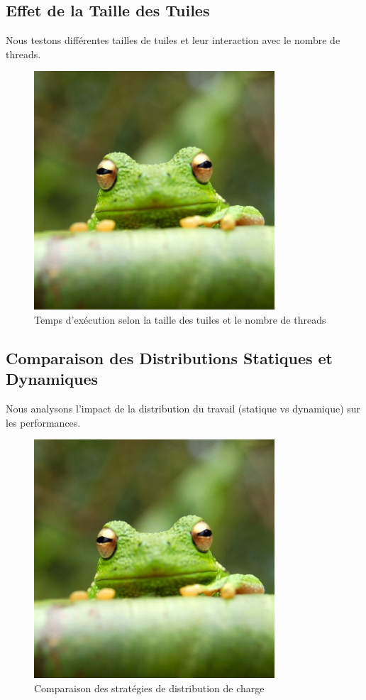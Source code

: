 \documentclass{article}
\begin{document}
\subsection{Effet de la Taille des Tuiles}
Nous testons différentes tailles de tuiles et leur interaction avec le nombre de threads.

\begin{figure}[h]
    \centering
    \includegraphics[width=0.8\textwidth]{frog.jpg}  %
    \caption{Temps d'exécution selon la taille des tuiles et le nombre de threads}
    \label{fig:taille_tuiles}
\end{figure}

\subsection{Comparaison des Distributions Statiques et Dynamiques}
Nous analysons l'impact de la distribution du travail (statique vs dynamique) sur les performances.

\begin{figure}[h]
    \centering
    \includegraphics[width=0.8\textwidth]{frog.jpg}  %
    \caption{Comparaison des stratégies de distribution de charge}
    \label{fig:distribution_charge}
\end{figure}
\end{document}
